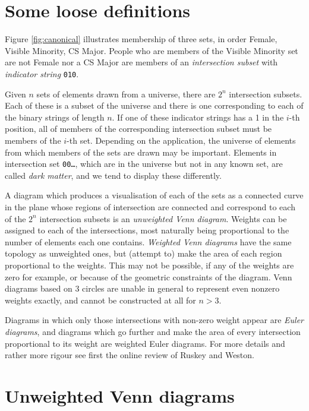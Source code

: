 \documentclass[a4paper]{article}
\begin{document}
\section{Some loose definitions}
Figure \ref{fig:canonical} illustrates membership of three sets,
in order Female,  Visible Minority, CS Major. 
People who are members of the Visible Minority set are not Female  nor a CS Major
are members of an \emph{intersection subset} with \emph{indicator string} 
\texttt{010}.

Given $n$ sets of elements drawn from a universe,
 there are $2^n$ {intersection subsets}. Each of these is 
a subset of the universe and there
is one corresponding to each of  the binary strings of length $n$.
If one of these indicator strings has a 1 in the $i$-th position, all of members of the 
corresponding intersection subset must be members of the $i$-th set. Depending on the application, the 
universe of elements from which members of the sets are drawn 
may be important. 
Elements in intersection set \texttt{00\ldots}, which are in 
the universe but not in any known set, are called \emph{dark matter},
and we tend to display these differently.

A diagram which produces a visualisation of each of the sets
as a connected curve in the plane whose regions of intersection
are connected and correspond to each of the $2^n$ intersection subsets
is an \emph{unweighted Venn diagram}.
Weights can be assigned to each of the intersections,
most naturally being proportional to the number of elements each one contains.
\emph{Weighted Venn diagrams} have the same topology as unweighted ones, but 
(attempt to) make the area of each region proportional to the weights. 
This may not be possible, if any of the weights are zero for example, or because 
of the geometric constraints of the diagram. Venn diagrams based on 3 circles
are unable in general to represent even nonzero weights exactly, and cannot be constructed
at all for $n>3$.

Diagrams in which only those intersections with non-zero weight appear are \emph{Euler diagrams},
and diagrams which go further and make the area of every intersection proportional to its weight are weighted Euler diagrams.
For more details and rather more rigour see first the online review of Ruskey and Weston\cite{ruskeyweston:2005}.


\section{Unweighted Venn diagrams}
\end{document}
